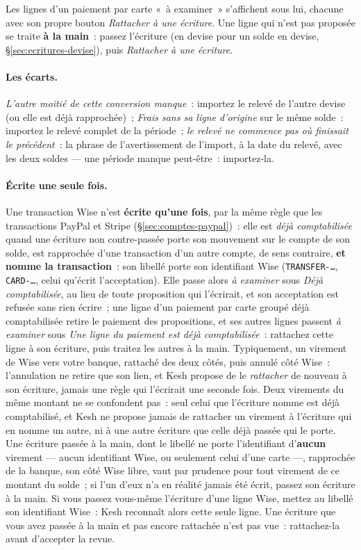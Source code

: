 \documentclass[a4paper,11pt,oneside]{article}
\begin{document}
Les lignes d'un paiement par carte «~à examiner~» s'affichent sous lui, chacune avec son propre bouton \emph{Rattacher à une écriture}. Une ligne qui n'est pas proposée se traite \textbf{à la main}~: passez l'écriture (en devise pour un solde en devise, \S\ref{sec:ecritures-devise}), puis \emph{Rattacher à une écriture}.

\paragraph{Les écarts.} \emph{L'autre moitié de cette conversion manque}~: importez le relevé de l'autre devise (ou elle est déjà rapprochée)~; \emph{Frais sans sa ligne d'origine} sur le même solde~: importez le relevé complet de la période~; \emph{le relevé ne commence pas où finissait le précédent}~: la phrase de l'avertissement de l'import, à la date du relevé, avec les deux soldes --- une période manque peut-être~: importez-la.

\paragraph{Écrite une seule fois.} Une transaction Wise n'est \textbf{écrite qu'une fois}, par la même règle que les transactions PayPal et Stripe (\S\ref{sec:comptes-paypal})~: elle est \emph{déjà comptabilisée} quand une écriture non contre-passée porte son mouvement sur le compte de son solde, est rapprochée d'une transaction d'un autre compte, de sens contraire, \textbf{et nomme la transaction}~: son libellé porte son identifiant Wise (\texttt{TRANSFER-\dots}, \texttt{CARD-\dots}, celui qu'écrit l'acceptation). Elle passe alors \emph{à examiner} sous \emph{Déjà comptabilisée}, au lieu de toute proposition qui l'écrirait, et son acceptation est refusée sans rien écrire~; une ligne d'un paiement par carte groupé déjà comptabilisée retire le paiement des propositions, et ses autres lignes passent \emph{à examiner} sous \emph{Une ligne du paiement est déjà comptabilisée}~: rattachez cette ligne à son écriture, puis traitez les autres à la main. Typiquement, un virement de Wise vers votre banque, rattaché des deux côtés, puis annulé côté Wise~: l'annulation ne retire que son lien, et Kesh propose de le \emph{rattacher} de nouveau à son écriture, jamais une règle qui l'écrirait une seconde fois. Deux virements du même montant ne se confondent pas~: seul celui que l'écriture nomme est déjà comptabilisé, et Kesh ne propose jamais de rattacher un virement à l'écriture qui en nomme un autre, ni à une autre écriture que celle déjà passée qui le porte. Une écriture passée à la main, dont le libellé ne porte l'identifiant d'\textbf{aucun} virement --- aucun identifiant Wise, ou seulement celui d'une carte ---, rapprochée de la banque, son côté Wise libre, vaut par prudence pour tout virement de ce montant du solde~; si l'un d'eux n'a en réalité jamais été écrit, passez son écriture à la main. Si vous passez vous-même l'écriture d'une ligne Wise, mettez au libellé son identifiant Wise~: Kesh reconnaît alors cette seule ligne. Une écriture que vous avez passée à la main et pas encore rattachée n'est pas vue~: rattachez-la avant d'accepter la revue.
\end{document}
